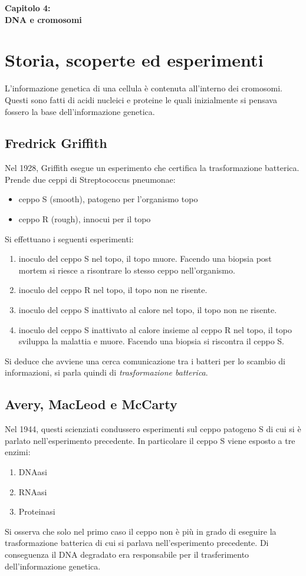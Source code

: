 \Large\textbf{Capitolo 4: \\DNA e cromosomi}

\section{Storia, scoperte ed esperimenti}
    \small
    L'informazione genetica di una cellula è contenuta all'interno dei cromosomi. Questi sono fatti di acidi nucleici e proteine le quali inizialmente si pensava fossero la base dell'informazione genetica.
    \subsection{Fredrick Griffith}
        Nel 1928, Griffith esegue un esperimento che certifica la trasformazione batterica. Prende due ceppi di Streptococcus pneumonae:
        \begin{itemize}
            \item ceppo S (smooth), patogeno per l'organismo topo
            \item ceppo R (rough), innocui per il topo
        \end{itemize}
        Si effettuano i seguenti esperimenti:
        \begin{enumerate}
            \item inoculo del ceppo S nel topo, il topo muore. Facendo una biopsia post mortem si riesce a risontrare lo stesso ceppo nell'organismo.
            \item inoculo del ceppo R nel topo, il topo non ne risente.
            \item inoculo del ceppo S inattivato al calore nel topo, il topo non ne risente.
            \item inoculo del ceppo S inattivato al calore insieme al ceppo R nel topo, il topo sviluppa la malattia e muore. Facendo una biopsia si riscontra il ceppo S.
        \end{enumerate}
        Si deduce che avviene una cerca comunicazione tra i batteri per lo scambio di informazioni, si parla quindi di \textit{trasformazione batterica}.
        
    \subsection{Avery, MacLeod e McCarty}
    Nel 1944, questi scienziati condussero esperimenti sul ceppo patogeno S di cui si è parlato nell'esperimento precedente. In particolare il ceppo S viene esposto a tre enzimi:
    \begin{enumerate}
        \item DNAasi
        \item RNAasi
        \item Proteinasi
    \end{enumerate}
    Si osserva che solo nel primo caso il ceppo non è più in grado di eseguire la trasformazione batterica di cui si parlava nell'esperimento precedente. Di conseguenza il DNA degradato era responsabile per il trasferimento dell'informazione genetica.
    
